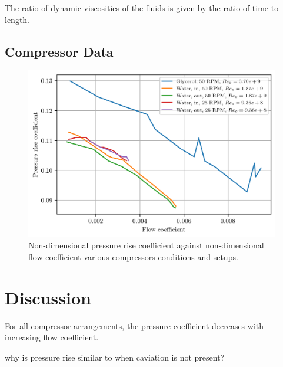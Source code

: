 \documentclass{article}
\begin{document}
The ratio of dynamic viscosities of the fluids is given by the ratio of time to length.

\subsection{Compressor Data}

\begin{figure}[H]
    \centering
    \includegraphics[width=0.99\textwidth]{compressor_non_dims.png}
    \caption{Non-dimensional pressure rise coefficient against non-dimensional flow coefficient various compressors conditions and setups.}
    \label{fig:compressor_non_dims}
\end{figure}


\section{Discussion}

For all compressor arrangements, the pressure coefficient decreases with increasing flow coefficient.



why is pressure rise similar to when caviation is not present?

\end{document}
